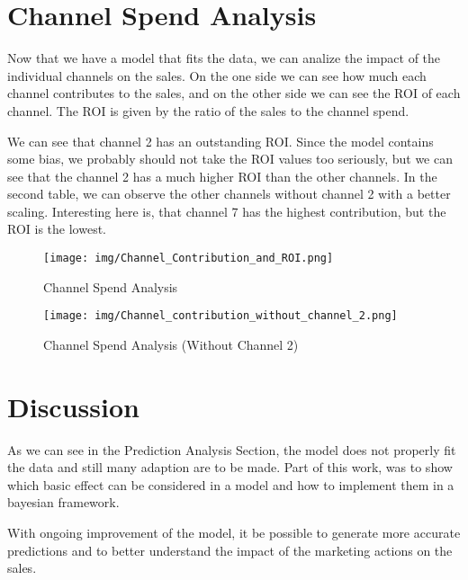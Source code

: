 \documentclass{article}
\begin{document}
\section{Channel Spend Analysis}
Now that we have a model that fits the data, we can analize the impact of the individual channels on the sales.
On the one side we can see how much each channel contributes to the sales, and on the other side we can see the ROI of each channel.
The ROI is given by the ratio of the sales to the channel spend.

We can see that channel 2 has an outstanding ROI. Since the model contains some bias, we probably should not take the ROI values too seriously, 
but we can see that the channel 2 has a much higher ROI than the other channels.
In the second table, we can observe the other channels without channel 2 with a better scaling.
Interesting here is, that channel 7 has the highest contribution, but the ROI is the lowest.


\noindent
\begin{figure}[H]
    \centering
    \begin{minipage}[t]{0.48\textwidth}
        \centering
        \texttt{[image: img/Channel\_Contribution\_and\_ROI.png]}
        \caption{Channel Spend Analysis}
        \label{fig:channel_contribution_roi}
    \end{minipage}
    \hfill %
    \begin{minipage}[t]{0.48\textwidth}
        \centering
        \texttt{[image: img/Channel\_contribution\_without\_channel\_2.png]}
        \caption{Channel Spend Analysis (Without Channel 2)}
        \label{fig:channel_contribution_no_channel_2}
    \end{minipage}
\end{figure}



\section{Discussion}
As we can see in the Prediction Analysis Section, the model does not properly fit the data and still many adaption are to be made. 
Part of this work, was to show which basic effect can be considered in a model and how to implement them in a bayesian framework.

With ongoing improvement of the model, it be possible to generate more accurate predictions and to better understand the impact of the marketing actions on the sales.
\end{document}
